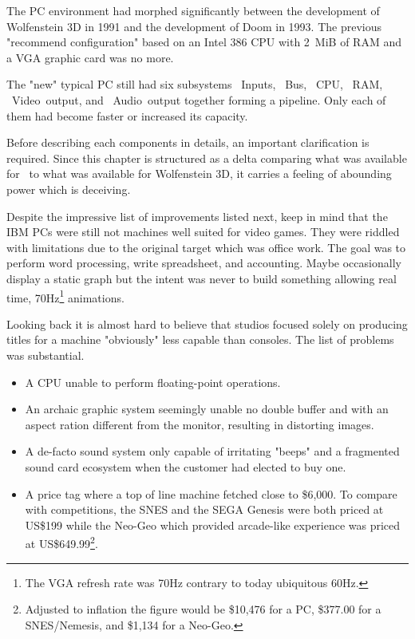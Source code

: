 The PC environment had morphed significantly between the development of Wolfenstein 3D in 1991 and the development of Doom in 1993. The previous "recommend configuration" based on an Intel 386 CPU with 2~MiB of RAM and a VGA graphic card was no more.\\
\par
The "new" typical PC still had six subsystems ~Inputs, ~Bus, ~CPU, ~RAM, ~Video~output, and ~Audio~output together forming a pipeline. Only each of them had become faster or increased its capacity.\\
\par
\vspace{2mm}
\par
 Before describing each components in details, an important clarification is required. Since this chapter is structured as a delta comparing what was available for \doom~to what was available for Wolfenstein 3D, it carries a feeling of abounding power which is deceiving. \\
 \par
 Despite the impressive list of improvements listed next, keep in mind that the IBM PCs were still not machines well suited for video games. They were riddled with limitations due to the original target which was office work. The goal was to perform word processing, write spreadsheet, and accounting. Maybe occasionally display a static graph but the intent was never to build something allowing real time, 70Hz\footnote{The VGA refresh rate was 70Hz contrary to today ubiquitous 60Hz.} animations.\\ 
\par 
Looking back it is almost hard to believe that studios focused solely on producing titles for a machine "obviously" less capable than consoles. The list of problems was substantial.
\begin{itemize}
\item A CPU unable to perform floating-point operations.
\item An archaic graphic system seemingly unable no double buffer and with an aspect ration different from the monitor, resulting in distorting images.
\item A de-facto sound system only capable of irritating "beeps" and a fragmented sound card ecosystem when the customer had elected to buy one.
\item A price tag where a top of line machine fetched close to \$6,000. To compare with competitions, the SNES and the SEGA Genesis were both priced at US\$199 while the Neo-Geo which provided arcade-like experience was priced at US\$649.99\footnote{Adjusted to inflation the figure would be \$10,476 for a PC, \$377.00 for a SNES/Nemesis, and \$1,134 for a Neo-Geo.}.
\end{itemize}
